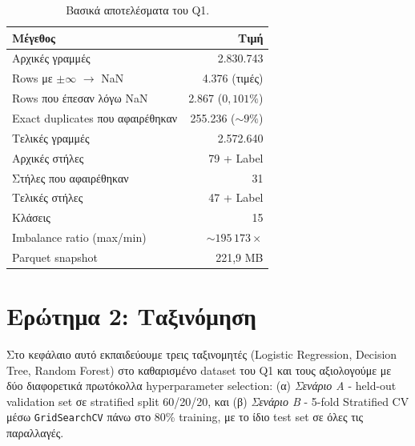 \documentclass[12pt,a4paper,twoside]{book}
\begin{document}
\begin{table}[H]
    \centering
    \begin{tabular}{lr}
        \toprule
        \textbf{Μέγεθος}                            & \textbf{Τιμή}        \\
        \midrule
        Αρχικές γραμμές                             & 2.830.743            \\
        Rows με \(\pm\infty\) \(\to\) NaN           & 4.376 (τιμές)        \\
        Rows που έπεσαν λόγω NaN                    & 2.867 (\(0,101\%\))  \\
        Exact duplicates που αφαιρέθηκαν            & 255.236 (\(\sim 9\%\)) \\
        Τελικές γραμμές                             & 2.572.640            \\
        Αρχικές στήλες                              & 79 + Label           \\
        Στήλες που αφαιρέθηκαν                      & 31                   \\
        Τελικές στήλες                              & 47 + Label           \\
        Κλάσεις                                     & 15                   \\
        Imbalance ratio (max/min)                   & \(\sim 195\,173\times\) \\
        Parquet snapshot                            & 221,9 MB             \\
        \bottomrule
    \end{tabular}
    \caption{Βασικά αποτελέσματα του Q1.}\label{tab:q1_summary}
\end{table}

\chapter{Ερώτημα 2: Ταξινόμηση}\label{ch:q2}

Στο κεφάλαιο αυτό εκπαιδεύουμε τρεις ταξινομητές (Logistic Regression,
Decision Tree, Random Forest) στο καθαρισμένο dataset του Q1 και τους
αξιολογούμε με δύο διαφορετικά πρωτόκολλα hyperparameter selection:
(α) \emph{Σενάριο A} - held-out validation set σε stratified split
60/20/20, και (β) \emph{Σενάριο B} - 5-fold Stratified CV μέσω
\texttt{GridSearchCV} πάνω στο 80\% training, με το ίδιο test set σε
όλες τις παραλλαγές.
\end{document}
